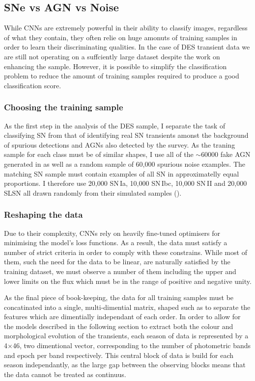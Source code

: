 \subsection{SNe vs AGN vs Noise}
While CNNs are extremely powerful in their ability to classify images, regardless of what they contain, they often relie on huge amonuts of training samples in order to learn their discriminating qualities. In the case of DES transient data we are still not operating on a suffciently large dataset despite the work on enhancing the sample. However, it is possible to simplify the classification problem to reduce the amount of training samples required to produce a good classification score.

\subsubsection{Choosing the training sample} \label{sec:AGNNoiseSNSample}
As the first step in the analysis of the DES sample, I separate the task of classifying SN from that of identifying real SN transients amonst the background of spurious detections and AGNs also detected by the survey. As the traning sample for each class must be of similar shapes, I use all of the $\sim60000$ fake AGN generated in  as well as a random sample of 60,000 spurious noise examples. The matching SN sample must contain examples of all SN in approximatelly equal proportions. I therefore use 20,000 SN\,Ia, 10,000 SN\,Ibc, 10,000 SN\,II and 20,000 SLSN all drawn randomly from their simulated samples ().

\subsubsection{Reshaping the data}
Due to their complexity, CNNs rely on heavily fine-tuned optimisers for minimising the model's loss functions. As a result, the data must satisfy a number of strict criteria in order to comply with these constrains. While most of them, such the need for the data to be linear, are naturally satisfied by the training dataset, we must observe a number of them including the upper and lower limits on the flux which must be in the range of positive and negative unity.

As the final piece of book-keeping, the data for all training samples must be concatinated into a single, multi-dimential matrix, shaped such as to separate the features which are dimentially independant of each order. In order to allow for the models described in the following section to extract both the colour and morphological evolution of the transients, each season of data is represented by a 4$\times$46, two dimentional vector, corresponding to the number of photometric bands and epoch per band respectively. This central block of data is build for each season independantly, as the large gap between the observing blocks means that the data cannot be treated as continuus.

